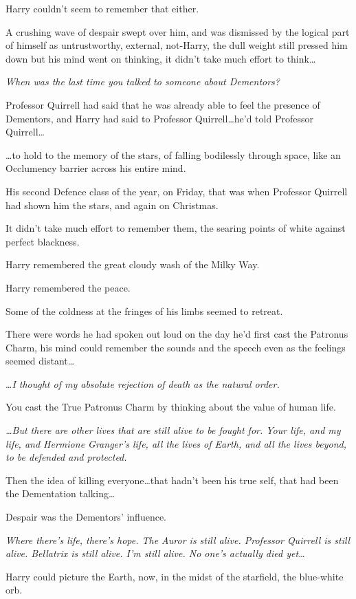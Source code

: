 Harry couldn’t seem to remember that either.

A crushing wave of despair swept over him, and was dismissed by the logical part of himself as untrustworthy, external, not-Harry, the dull weight still pressed him down but his mind went on thinking, it didn’t take much effort to think…

\emph{When was the last time you talked to someone about Dementors?}

Professor Quirrell had said that he was already able to feel the presence of Dementors, and Harry had said to Professor Quirrell…he’d told Professor Quirrell…

…to hold to the memory of the stars, of falling bodilessly through space, like an Occlumency barrier across his entire mind.

His second Defence class of the year, on Friday, that was when Professor Quirrell had shown him the stars, and again on Christmas.

It didn’t take much effort to remember them, the searing points of white against perfect blackness.

Harry remembered the great cloudy wash of the Milky Way.

Harry remembered the peace.

Some of the coldness at the fringes of his limbs seemed to retreat.

There were words he had spoken out loud on the day he’d first cast the Patronus Charm, his mind could remember the sounds and the speech even as the feelings seemed distant…

…\emph{I thought of my absolute rejection of death as the natural order.}

You cast the True Patronus Charm by thinking about the value of human life.

\emph{…But there are other lives that are still alive to be fought for. Your life, and my life, and Hermione Granger’s life, all the lives of Earth, and all the lives beyond, to be defended and protected.}

Then the idea of killing everyone…that hadn’t been his true self, that had been the Dementation talking…

Despair was the Dementors’ influence.

\emph{Where there’s life, there’s hope. The Auror is still alive. Professor Quirrell is still alive. Bellatrix is still alive. I’m still alive. No one’s actually died yet…}

Harry could picture the Earth, now, in the midst of the starfield, the blue-white orb.

